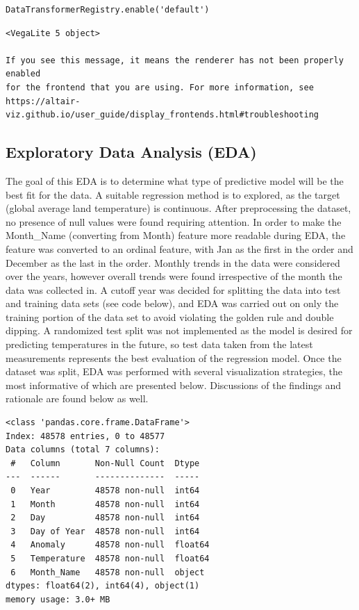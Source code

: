 \documentclass[
  letterpaper,
  DIV=11,
  numbers=noendperiod]{scrartcl}
\begin{document}
\begin{verbatim}
DataTransformerRegistry.enable('default')
\end{verbatim}

\begin{verbatim}
<VegaLite 5 object>

If you see this message, it means the renderer has not been properly enabled
for the frontend that you are using. For more information, see
https://altair-viz.github.io/user_guide/display_frontends.html#troubleshooting
\end{verbatim}

\subsection{Exploratory Data Analysis
(EDA)}\label{exploratory-data-analysis-eda}

The goal of this EDA is to determine what type of predictive model will
be the best fit for the data. A suitable regression method is to
explored, as the target (global average land temperature) is continuous.
After preprocessing the dataset, no presence of null values were found
requiring attention. In order to make the Month\_Name (converting from
Month) feature more readable during EDA, the feature was converted to an
ordinal feature, with Jan as the first in the order and December as the
last in the order. Monthly trends in the data were considered over the
years, however overall trends were found irrespective of the month the
data was collected in. A cutoff year was decided for splitting the data
into test and training data sets (see code below), and EDA was carried
out on only the training portion of the data set to avoid violating the
golden rule and double dipping. A randomized test split was not
implemented as the model is desired for predicting temperatures in the
future, so test data taken from the latest measurements represents the
best evaluation of the regression model. Once the dataset was split, EDA
was performed with several visualization strategies, the most
informative of which are presented below. Discussions of the findings
and rationale are found below as well.

\begin{verbatim}
<class 'pandas.core.frame.DataFrame'>
Index: 48578 entries, 0 to 48577
Data columns (total 7 columns):
 #   Column       Non-Null Count  Dtype  
---  ------       --------------  -----  
 0   Year         48578 non-null  int64  
 1   Month        48578 non-null  int64  
 2   Day          48578 non-null  int64  
 3   Day of Year  48578 non-null  int64  
 4   Anomaly      48578 non-null  float64
 5   Temperature  48578 non-null  float64
 6   Month_Name   48578 non-null  object 
dtypes: float64(2), int64(4), object(1)
memory usage: 3.0+ MB
\end{verbatim}
\end{document}

